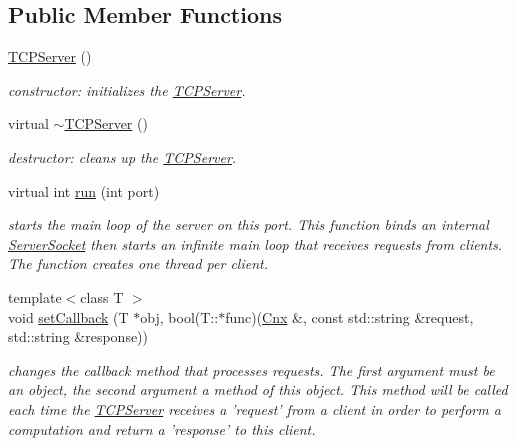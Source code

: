 \subsection*{Public Member Functions}
\begin{DoxyCompactItemize}
\item 
\hypertarget{classTCPServer_a3a5e3cfe42c676ed71f2bc58dcc92bda}{\hyperlink{classTCPServer_a3a5e3cfe42c676ed71f2bc58dcc92bda}{T\-C\-P\-Server} ()}\label{classTCPServer_a3a5e3cfe42c676ed71f2bc58dcc92bda}

\begin{DoxyCompactList}\small\item\em constructor\-: initializes the \hyperlink{classTCPServer}{T\-C\-P\-Server}. \end{DoxyCompactList}\item 
\hypertarget{classTCPServer_abc497ac52355e53986a6a1bd1acb9581}{virtual \hyperlink{classTCPServer_abc497ac52355e53986a6a1bd1acb9581}{$\sim$\-T\-C\-P\-Server} ()}\label{classTCPServer_abc497ac52355e53986a6a1bd1acb9581}

\begin{DoxyCompactList}\small\item\em destructor\-: cleans up the \hyperlink{classTCPServer}{T\-C\-P\-Server}. \end{DoxyCompactList}\item 
virtual int \hyperlink{classTCPServer_a1409041961e91f1dbc4933483b4c3b23}{run} (int port)
\begin{DoxyCompactList}\small\item\em starts the main loop of the server on this port. This function binds an internal \hyperlink{classServerSocket}{Server\-Socket} then starts an infinite main loop that receives requests from clients. The function creates one thread per client. \end{DoxyCompactList}\item 
{\footnotesize template$<$class T $>$ }\\void \hyperlink{classTCPServer_ac62c8c7a1d1137b74e2a1fa6d8a4a876}{set\-Callback} (T $\ast$obj, bool(T\-::$\ast$func)(\hyperlink{classTCPServer_1_1Cnx}{Cnx} \&, const std\-::string \&request, std\-::string \&response))
\begin{DoxyCompactList}\small\item\em changes the callback method that processes requests. The first argument must be an object, the second argument a method of this object. This method will be called each time the \hyperlink{classTCPServer}{T\-C\-P\-Server} receives a 'request' from a client in order to perform a computation and return a 'response' to this client. \end{DoxyCompactList}\end{DoxyCompactItemize}
